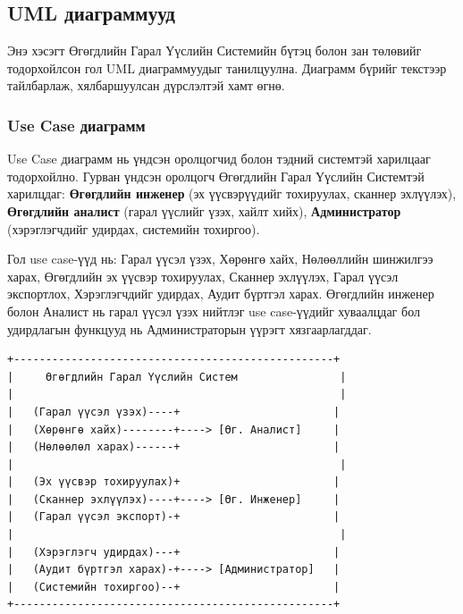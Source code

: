 \subsection{UML диаграммууд}
\label{subsec:dl_uml}

Энэ хэсэгт Өгөгдлийн Гарал Үүслийн Системийн бүтэц болон зан төлөвийг тодорхойлсон гол UML диаграммуудыг танилцуулна. Диаграмм бүрийг текстээр тайлбарлаж, хялбаршуулсан дүрслэлтэй хамт өгнө.

\subsubsection{Use Case диаграмм}

Use Case диаграмм нь үндсэн оролцогчид болон тэдний системтэй харилцааг тодорхойлно. Гурван үндсэн оролцогч Өгөгдлийн Гарал Үүслийн Системтэй харилцдаг: \textbf{Өгөгдлийн инженер} (эх үүсвэрүүдийг тохируулах, сканнер эхлүүлэх), \textbf{Өгөгдлийн аналист} (гарал үүслийг үзэх, хайлт хийх), \textbf{Администратор} (хэрэглэгчдийг удирдах, системийн тохиргоо).

Гол use case-үүд нь: Гарал үүсэл үзэх, Хөрөнгө хайх, Нөлөөллийн шинжилгээ харах, Өгөгдлийн эх үүсвэр тохируулах, Сканнер эхлүүлэх, Гарал үүсэл экспортлох, Хэрэглэгчдийг удирдах, Аудит бүртгэл харах. Өгөгдлийн инженер болон Аналист нь гарал үүсэл үзэх нийтлэг use case-үүдийг хуваалцдаг бол удирдлагын функцууд нь Администраторын үүрэгт хязгаарлагддаг.

\begin{verbatim}
+--------------------------------------------------+
|     Өгөгдлийн Гарал Үүслийн Систем                |
|                                                   |
|   (Гарал үүсэл үзэх)----+                        |
|   (Хөрөнгө хайх)--------+----> [Өг. Аналист]     |
|   (Нөлөөлөл харах)------+                        |
|                                                   |
|   (Эх үүсвэр тохируулах)+                        |
|   (Сканнер эхлүүлэх)----+----> [Өг. Инженер]     |
|   (Гарал үүсэл экспорт)-+                        |
|                                                   |
|   (Хэрэглэгч удирдах)---+                        |
|   (Аудит бүртгэл харах)-+----> [Администратор]   |
|   (Системийн тохиргоо)--+                        |
+--------------------------------------------------+
\end{verbatim}

